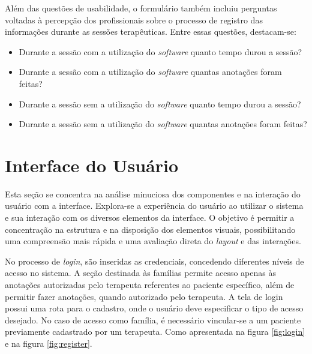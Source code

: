 Além das questões de usabilidade, o formulário também incluiu perguntas voltadas à
percepção dos profissionais sobre o processo de registro das informações durante
as sessões terapêuticas. Entre essas questões, destacam-se:

\begin{itemize}
\item Durante a sessão com a utilização do \textit{software} quanto tempo durou a sessão?
\item Durante a sessão com a utilização do \textit{software} quantas anotações foram feitas?
\item Durante a sessão sem a utilização do \textit{software} quanto tempo durou a sessão?
\item Durante a sessão sem a utilização do \textit{software} quantas anotações foram feitas?
\end{itemize}

\section{Interface do Usuário}\label{sec:interface_usuário}

Esta seção se concentra na análise minuciosa dos componentes e na interação do usuário com a interface. 
Explora-se a experiência do usuário ao utilizar o sistema e sua interação com os diversos elementos da interface. 
O objetivo é permitir a concentração na estrutura e na disposição dos elementos visuais, 
possibilitando uma compreensão mais rápida e uma avaliação direta do \textit{layout} e das interações.

No processo de \textit{login}, são inseridas as credenciais, 
concedendo diferentes níveis de acesso no sistema. 
A seção destinada às famílias permite acesso apenas às anotações autorizadas pelo terapeuta referentes 
ao paciente específico, além de permitir fazer anotações, quando autorizado pelo terapeuta. 
A tela de login possui uma rota para o cadastro, 
onde o usuário deve especificar o tipo de acesso desejado. No caso de acesso como família, 
é necessário vincular-se a um paciente previamente cadastrado por um terapeuta. 
Como apresentada na figura \ref{fig:login} e na figura \ref{fig:register}.

